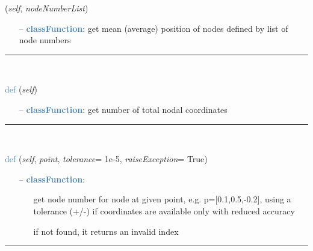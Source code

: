 \begin{itemize}[leftmargin=1.4cm]
\begin{itemize}[leftmargin=1.4cm]
\begin{itemize}[leftmargin=0.5cm]
\begin{itemize}[leftmargin=1.4cm]
\begin{itemize}[leftmargin=1.4cm]
\begin{itemize}[leftmargin=0.5cm]
\begin{flushleft}
({\it self}, {\it nodeNumberList})
\end{flushleft}
\setlength{\itemindent}{0.7cm}
\begin{itemize}[leftmargin=0.7cm]
\item[--]\textcolor{steelblue}{\bf classFunction}: get mean (average) position of nodes defined by list of node numbers
\vspace{12pt}\end{itemize}
%
\noindent\rule{8cm}{0.75pt}\vspace{1pt} \\ 
\begin{flushleft}
\noindent \textcolor{steelblue}{def {\bf {}}}\label{sec:FEM:FEMinterface:NumberOfCoordinates}
({\it self})
\end{flushleft}
\setlength{\itemindent}{0.7cm}
\begin{itemize}[leftmargin=0.7cm]
\item[--]\textcolor{steelblue}{\bf classFunction}: get number of total nodal coordinates
\vspace{12pt}\end{itemize}
%
\noindent\rule{8cm}{0.75pt}\vspace{1pt} \\ 
\begin{flushleft}
\noindent \textcolor{steelblue}{def {\bf {}}}\label{sec:FEM:FEMinterface:GetNodeAtPoint}
({\it self}, {\it point}, {\it tolerance}= 1e-5, {\it raiseException}= True)
\end{flushleft}
\setlength{\itemindent}{0.7cm}
\begin{itemize}[leftmargin=0.7cm]
\item[--]\textcolor{steelblue}{\bf classFunction}: \vspace{-6pt}
\begin{itemize}[leftmargin=1.2cm]
\setlength{\itemindent}{-0.7cm}
\item[]get node number for node at given point, e.g. p=[0.1,0.5,-0.2], using a tolerance (+/-) if coordinates are available only with reduced accuracy
\item[]if not found, it returns an invalid index
\end{itemize}
\vspace{12pt}\end{itemize}
%
\noindent\rule{8cm}{0.75pt}\vspace{1pt} \\ 

\end{itemize}
\end{itemize}
\end{itemize}
\end{itemize}
\end{itemize}
\end{itemize}
